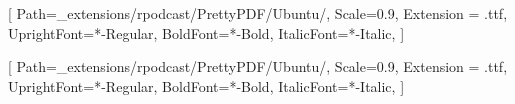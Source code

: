\makeatletter
\renewcommand{\maketitle}{\bgroup\setlength{\parindent}{0pt}
\begin{flushleft}
  {\sffamily\huge\textbf{\MakeUppercase{\@title}}} \vspace{0.3cm} \newline
  {\Large {\@subtitle}} \newline
  \@author
\end{flushleft}\egroup
}
\makeatother

\setsansfont{Ubuntu}[
    Path=_extensions/rpodcast/PrettyPDF/Ubuntu/,
    Scale=0.9,
    Extension = .ttf,
    UprightFont=*-Regular,
    BoldFont=*-Bold,
    ItalicFont=*-Italic,
    ]

\setmainfont{Ubuntu}[
    Path=_extensions/rpodcast/PrettyPDF/Ubuntu/,
    Scale=0.9,
    Extension = .ttf,
    UprightFont=*-Regular,
    BoldFont=*-Bold,
    ItalicFont=*-Italic,
    ]
